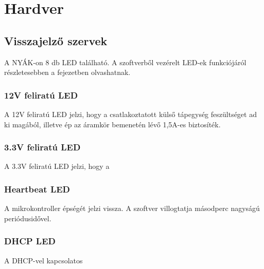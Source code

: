 \chapter{Hardver}

\section{Visszajelző szervek}
A NYÁK-on 8 db LED található.
A szoftverből vezérelt LED-ek funkciójáról részletesebben a %
fejezetben olvashatnak.

\subsection{12V feliratú LED}
A 12V feliratú LED jelzi, hogy a csatlakoztatott külső tápegység feszültséget ad ki magából, illetve ép az áramkör bemenetén lévő 1,5A-es biztosíték.
\subsection{3.3V feliratú LED}
A 3.3V feliratú LED jelzi, hogy a %

\subsection{Heartbeat LED}
A mikrokontroller épségét jelzi vissza. A szoftver villogtatja másodperc nagyságú periódusidővel.
\subsection{DHCP LED}
A DHCP-vel kapcsolatos 


